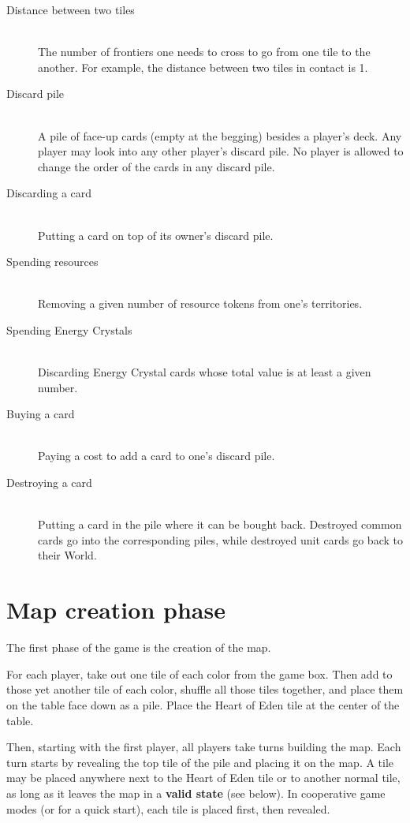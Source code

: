 \documentclass[a4paper]{article}
\begin{document}
    \begin{description}
        \item[Distance between two tiles] \hfill \\
            The number of frontiers one needs to cross to go from one tile to the another.
            For example, the distance between two tiles in contact is 1.
        \item[Discard pile] \hfill \\
            A pile of face-up cards (empty at the begging) besides a player's deck.
            Any player may look into any other player's discard pile.
            No player is allowed to change the order of the cards in any discard pile.
        \item[Discarding a card] \hfill \\
            Putting a card on top of its owner's discard pile.
        \item[Spending resources] \hfill \\
            Removing a given number of resource tokens from one's territories.
        \item[Spending Energy Crystals] \hfill \\
            Discarding Energy Crystal cards whose total value is at least a given number.
        \item[Buying a card] \hfill \\
            Paying a cost to add a card to one's discard pile.
        \item[Destroying a card] \hfill \\
            Putting a card in the pile where it can be bought back.
            Destroyed common cards go into the corresponding piles,
            while destroyed unit cards go back to their World.
    \end{description}


\newpage
\section{Map creation phase}

    The first phase of the game is the creation of the map.
    
    For each player, take out one tile of each color from the game box.
    Then add to those yet another tile of each color, shuffle all those tiles together,
    and place them on the table face down as a pile.
    Place the Heart of Eden tile at the center of the table.
    
    Then, starting with the first player, all players take turns building the map.
    Each turn starts by revealing the top tile of the pile and placing it on the map.
    A tile may be placed anywhere next to the Heart of Eden tile or to another normal
    tile, as long as it leaves the map in a \textbf{valid state} (see below).
    In cooperative game modes (or for a quick start), each tile is placed first,
    then revealed.
    
\end{document}
